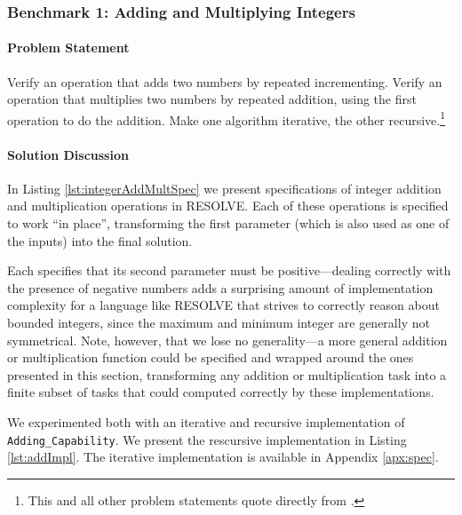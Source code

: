 		\subsubsection{Benchmark 1: Adding and Multiplying Integers}	%

\paragraph{Problem Statement}Verify an operation that adds two numbers by repeated incrementing. Verify an operation that multiplies two numbers by repeated addition, using the first operation to do the addition. Make one algorithm iterative, the other recursive.\footnote{This and all other problem statements quote directly from \cite{benchmarks}.}

\paragraph{Solution Discussion}In Listing \ref{lst:integerAddMultSpec} we present specifications of integer addition and multiplication operations in RESOLVE.  Each of these operations is specified to work ``in place'', transforming the first parameter (which is also used as one of the inputs) into the final solution.



Each specifies that its second parameter must be positive---dealing correctly with the presence of negative numbers adds a surprising amount of implementation complexity for a language like RESOLVE that strives to correctly reason about bounded integers, since the maximum and minimum integer are generally not symmetrical.  Note, however, that we lose no generality---a more general addition or multiplication function could be specified and wrapped around the ones presented in this section, transforming any addition or multiplication task into a finite subset of tasks that could computed correctly by these implementations.

We experimented both with an iterative and recursive implementation of \texttt{Adding\_Capability}.  We present the rescursive implementation in Listing \ref{lst:addImpl}.  The iterative implementation is available in Appendix \ref{apx:spec}.

